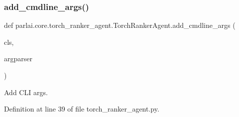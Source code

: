 \subsubsection{\texorpdfstring{add\+\_\+cmdline\+\_\+args()}{add\_cmdline\_args()}}
{\footnotesize\ttfamily def parlai.\+core.\+torch\+\_\+ranker\+\_\+agent.\+Torch\+Ranker\+Agent.\+add\+\_\+cmdline\+\_\+args (\begin{DoxyParamCaption}\item[{}]{cls,  }\item[{}]{argparser }\end{DoxyParamCaption})}

\begin{DoxyVerb}Add CLI args.
\end{DoxyVerb}
 

Definition at line 39 of file torch\+\_\+ranker\+\_\+agent.\+py.


